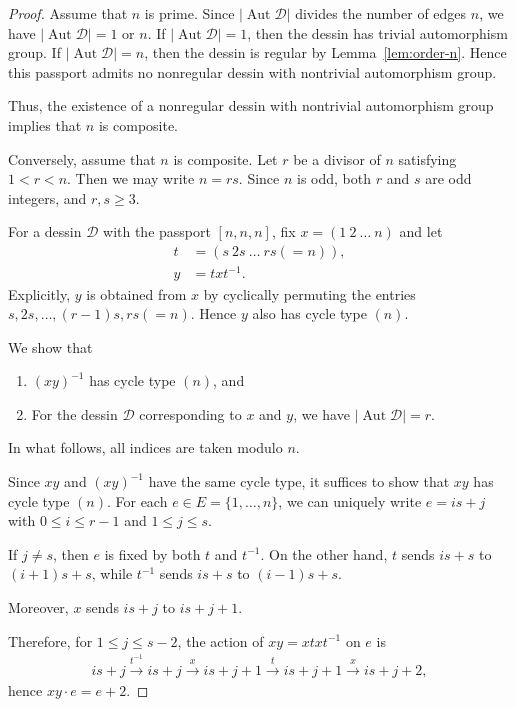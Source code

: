 \documentclass[12pt,reqno]{amsart}
\newcommand{\msD}{\mathscr{D}}
\newcommand{\HL}{\vspace{2mm}}							%
\newcommand{\vt}[1]{\left\lvert #1 \right\rvert}					%
\newcommand{\onarrow}[1]{\overset{#1}{\longrightarrow}}			%
\DeclareMathOperator{\Aut}{Aut}							%
\theoremstyle{mythmstyle}
\theoremstyle{mydefstyle}
\newcommand{\lemref}[1]{Lemma~\ref{#1}}
\newcommand{\AD}{\Aut{\msD}}
\numberwithin{equation}{section}
\begin{document}
\begin{proof}
Assume that $n$ is prime.
Since $\vt{\AD}$ divides the number of edges $n$, we have $\vt{\AD}=1$ or $n$.
If $\vt{\AD}=1$, then the dessin has trivial automorphism group.
If $\vt{\AD}=n$, then the dessin is regular by \lemref{lem:order-n}.
Hence this passport admits no nonregular dessin with nontrivial automorphism group.

Thus, the existence of a nonregular dessin with nontrivial automorphism group implies that $n$ is composite.

Conversely, assume that $n$ is composite. Let $r$ be a divisor of $n$ satisfying $1<r<n$.
Then we may write $n=rs$. Since $n$ is odd, both $r$ and $s$ are odd integers, and $r, s \ge 3$.

For a dessin $\msD$ with the passport $[n, n, n]$, fix $x = (1\ 2\ \ldots\ n)$ and let
\begin{align}
t &= (s\ 2s\ \ldots\ rs(= n)), \\
y &= txt^{-1}.
\end{align}
Explicitly, $y$ is obtained from $x$ by cyclically permuting the entries
$s,2s,\ldots,(r-1)s,rs(=n)$. Hence $y$ also has cycle type $(n)$.

We show that
\begin{enumerate}
\item \label{itm:c1xy} $(xy)^{-1}$ has cycle type $(n)$, and
\item \label{itm:c1AD} For the dessin $\msD$ corresponding to $x$ and $y$, we have $\vt{\AD}=r$.
\end{enumerate}

In what follows, all indices are taken modulo $n$.
\HL

\item[\ref{itm:c1xy}]
Since $xy$ and $(xy)^{-1}$ have the same cycle type, it suffices to show that $xy$ has cycle type $(n)$.
For each $e \in E = \{ 1, \ldots, n \}$, we can uniquely write $e = is+j$ with $0 \le i \le r-1$ and $1 \le j \le s$.

If $j\ne s$, then $e$ is fixed by both $t$ and $t^{-1}$.
On the other hand,
$t$ sends $is+s$ to $(i+1)s+s$, while $t^{-1}$ sends
$is+s$ to $(i-1)s+s$.

Moreover, $x$ sends $is+j$ to $is+j+1$.

Therefore, for $1\le j\le s-2$, the action of $xy=xtxt^{-1}$ on $e$ is
\begin{align}
is+j \onarrow{t^{-1}} is+j \onarrow{x} is+j+1 \onarrow{t} is+j+1 \onarrow{x} is+j+2,
\end{align}
hence $xy\cdot e = e+2$.


\end{proof}
\end{document}
